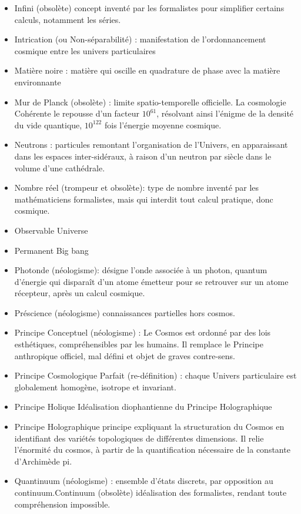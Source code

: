 \documentclass[a4paper,12pt]{article}
\begin{document}
\begin{appendix}
\begin{itemize}
\item Infini (obsolète) concept inventé par les formalistes pour simplifier certains calculs, notamment les séries.
\item Intrication (ou Non-séparabilité) : manifestation de l’ordonnancement cosmique entre les univers particulaires
\item Matière noire : matière qui oscille en quadrature de phase avec la matière environnante
\item Mur de Planck (obsolète) : limite spatio-temporelle officielle. La cosmologie Cohérente le repousse d’un facteur $10^{61}$, résolvant ainsi l’énigme de la densité du vide quantique, $10^{122}$ fois l’énergie moyenne cosmique.
\item Neutrons : particules remontant l’organisation de l’Univers, en apparaissant dans les espaces inter-sidéraux, à raison d’un neutron par siècle dans le volume d’une cathédrale.
\item Nombre réel (trompeur et obsolète): type de nombre inventé par les mathématiciens formalistes, mais qui interdit tout calcul pratique, donc cosmique.
\item Observable Universe
\item Permanent Big bang
\item Photonde (néologisme): désigne l’onde associée à un photon, quantum d’énergie qui disparaît d’un atome émetteur pour se retrouver sur un atome récepteur, après un calcul cosmique.
\item Préscience (néologisme) connaissances partielles hors cosmos.
\item Principe Conceptuel (néologisme) : Le Cosmos est ordonné par des lois esthétiques, compréhensibles par les humains. Il remplace le Principe anthropique officiel, mal défini et objet de graves contre-sens.
\item Principe Cosmologique Parfait (re-définition) : chaque Univers particulaire est globalement homogène, isotrope et invariant.
\item Principe Holique Idéalisation diophantienne du Principe Holographique
\item Principe Holographique principe expliquant la structuration du Cosmos en identifiant des variétés topologiques de différentes dimensions. Il relie l’énormité du cosmos, à partir de la quantification nécessaire de la constante d’Archimède pi.
\item Quantinuum (néologisme) : ensemble d’états discrets, par opposition au continuum.Continuum (obsolète) idéalisation des formalistes, rendant toute compréhension impossible.

\end{itemize}
\end{appendix}
\end{document}
